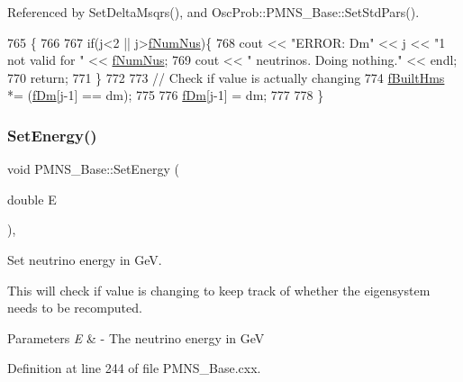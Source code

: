Referenced by Set\+Delta\+Msqrs(), and Osc\+Prob\+::\+P\+M\+N\+S\+\_\+\+Base\+::\+Set\+Std\+Pars().


\begin{DoxyCode}
765 \{
766 
767   \textcolor{keywordflow}{if}(j<2 || j>\hyperlink{classOscProb_1_1PMNS__Base_a24bb74bed63569dfe88b18fa6a08060e}{fNumNus})\{
768     cout << \textcolor{stringliteral}{"ERROR: Dm"} << j << \textcolor{stringliteral}{"1 not valid for "} << \hyperlink{classOscProb_1_1PMNS__Base_a24bb74bed63569dfe88b18fa6a08060e}{fNumNus};
769     cout << \textcolor{stringliteral}{" neutrinos. Doing nothing."} << endl;
770     \textcolor{keywordflow}{return};
771   \}
772 
773   \textcolor{comment}{// Check if value is actually changing}
774   \hyperlink{classOscProb_1_1PMNS__Base_a9ac3cadeac8db1b90f3152f476244780}{fBuiltHms} *= (\hyperlink{classOscProb_1_1PMNS__Base_a406a31c3b5d620e5a0cace5b411f9f70}{fDm}[j-1] == dm);
775 
776   \hyperlink{classOscProb_1_1PMNS__Base_a406a31c3b5d620e5a0cace5b411f9f70}{fDm}[j-1] = dm;
777 
778 \}
\end{DoxyCode}
\mbox{\label{classOscProb_1_1PMNS__Base_a95b3b0d0cab5e6a54b5ef99587f837c0}} 
\subsubsection{\texorpdfstring{Set\+Energy()}{SetEnergy()}}
{\footnotesize\ttfamily void P\+M\+N\+S\+\_\+\+Base\+::\+Set\+Energy (\begin{DoxyParamCaption}\item[{double}]{E }\end{DoxyParamCaption})\hspace{0.3cm}{\ttfamily [virtual]}, {\ttfamily [inherited]}}

Set neutrino energy in GeV.

This will check if value is changing to keep track of whether the eigensystem needs to be recomputed.


\begin{DoxyParams}{Parameters}
{\em E} & -\/ The neutrino energy in GeV \\
\hline
\end{DoxyParams}


Definition at line 244 of file P\+M\+N\+S\+\_\+\+Base.\+cxx.



